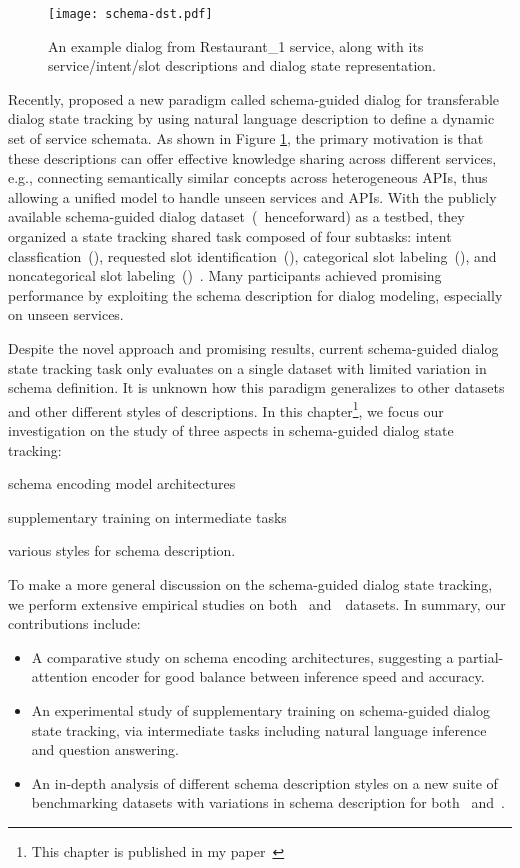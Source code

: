 \begin{figure}[!ht]
\centering
  \texttt{[image: schema-dst.pdf]}
  \caption{\label{fig:schema-dst} An example dialog from Restaurant\_1 service, along with its service/intent/slot descriptions and dialog state representation.}
\end{figure}


Recently, \citet{rastogi2019towards} proposed a new paradigm called
schema-guided dialog for transferable dialog state tracking by using
natural language description to define a dynamic set of service
schemata. As shown in Figure \ref{fig:schema-dst}, the primary
motivation is that these descriptions can offer effective knowledge
sharing across different services, e.g., connecting semantically
similar concepts across heterogeneous APIs, thus allowing a unified
model to handle unseen services and APIs. With the publicly available
schema-guided dialog dataset~(\sgdst~henceforward) as a
testbed, they organized a state tracking shared task composed of four subtasks:
intent classfication~(\IC), requested slot identification~(\RSI),
categorical slot labeling~(\CSL), and noncategorical slot
labeling~(\NSL)~\cite{rastogi2020schema}. Many participants achieved
promising performance by exploiting the schema description for dialog
modeling, especially on unseen services.

Despite the novel approach and promising results, current
schema-guided dialog state tracking task only evaluates on a single
dataset with limited variation in schema definition. It is unknown how
this paradigm generalizes to other datasets and other different styles
of descriptions. In this chapter\footnote{This chapter is published in
  my paper~\cite{cao2021schema}}, we focus our investigation on the
study of three aspects in schema-guided dialog state tracking:
\begin{inparaenum}[(1)]
\item schema encoding model architectures
\item supplementary training on intermediate tasks
\item various styles for schema description.
\end{inparaenum}
To make a more general discussion on
the schema-guided dialog state tracking, we perform extensive
empirical studies on both \sgdst~and~\multiwoz~datasets. In summary,
our contributions include:
\begin{itemize}
\item A comparative study
  on schema encoding architectures, suggesting a partial-attention
  encoder for good balance between inference speed and accuracy.
\item An experimental study of supplementary training on
  schema-guided dialog state tracking, via intermediate tasks
  including natural language inference and question answering.
\item An in-depth analysis of different schema description styles on a new
  suite of benchmarking datasets with
  variations in schema description for both \sgdst~and~\multiwoz.
\end{itemize}

